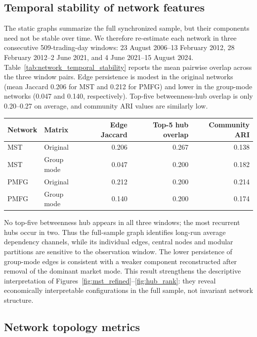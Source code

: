 \subsection{Temporal stability of network features}

The static graphs summarize the full synchronized sample, but their components need not be stable over time. We therefore re-estimate each network in three consecutive 509-trading-day windows: 23 August 2006--13 February 2012, 28 February 2012--2 June 2021, and 4 June 2021--15 August 2024. Table~\ref{tab:network_temporal_stability} reports the mean pairwise overlap across the three window pairs. Edge persistence is modest in the original networks (mean Jaccard 0.206 for MST and 0.212 for PMFG) and lower in the group-mode networks (0.047 and 0.140, respectively). Top-five betweenness-hub overlap is only 0.20--0.27 on average, and community ARI values are similarly low.

\begin{center}
\label{tab:network_temporal_stability}
\begin{tabular}{llrrr}
\toprule
Network & Matrix & Edge Jaccard & Top-5 hub overlap & Community ARI \\
\midrule
MST & Original & 0.206 & 0.267 & 0.138 \\
MST & Group mode & 0.047 & 0.200 & 0.182 \\
PMFG & Original & 0.212 & 0.200 & 0.214 \\
PMFG & Group mode & 0.140 & 0.200 & 0.174 \\
\bottomrule
\end{tabular}
\end{center}

No top-five betweenness hub appears in all three windows; the most recurrent hubs occur in two. Thus the full-sample graph identifies long-run average dependency channels, while its individual edges, central nodes and modular partitions are sensitive to the observation window. The lower persistence of group-mode edges is consistent with a weaker component reconstructed after removal of the dominant market mode. This result strengthens the descriptive interpretation of Figures~\ref{fig:mst_refined}--\ref{fig:hub_rank}: they reveal economically interpretable configurations in the full sample, not invariant network structure.

\subsection{Network topology metrics}

